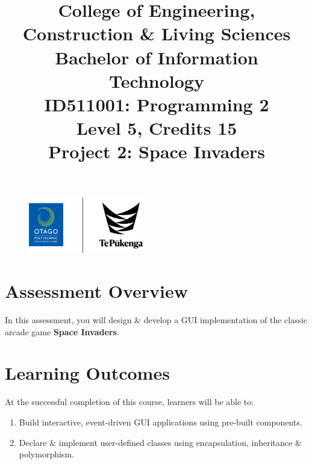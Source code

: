 \documentclass{article}
\author{}
\begin{document}
\begin{figure}
    \centering
    \includegraphics[width=50mm]{../../resources/img/logo.png}
\end{figure}

\title{College of Engineering, Construction \& Living Sciences\\Bachelor of Information Technology\\ID511001: Programming 2\\Level 5, Credits 15\\\textbf{Project 2: Space Invaders}}
\date{}
\maketitle

\section*{Assessment Overview}
In this assessment, you will design \& develop a GUI implementation of the classic arcade game \textbf{Space Invaders}.

\section*{Learning Outcomes}
At the successful completion of this course, learners will be able to:
\begin{enumerate}
    \item Build interactive, event-driven GUI applications using pre-built components.
    \item Declare \& implement user-defined classes using encapsulation, inheritance \& polymorphism.
\end{enumerate}
\end{document}
